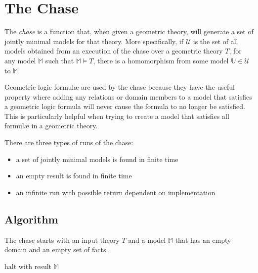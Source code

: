 \section{The Chase}

	The \emph{chase} is a function that, when given a geometric theory, will
	generate a set of jointly minimal models for that theory. More
	specifically, if $\mathcal{U}$ is the set of all models obtained from an
	execution of the chase over a geometric theory $T$, for any model
	$\mathbb{M}$ such that $\mathbb{M} \models T$, there is a homomorphism from
	some model $\mathbb{U} \in \mathcal{U}$ to $\mathbb{M}$.

	Geometric logic formul{\ae} are used by the chase because they have the
	useful property where adding any relations or domain members to a model
	that satisfies a geometric logic formula will never cause the formula to no
	longer be satisfied. This is particularly helpful when trying to create a
	model that satisfies all formul{\ae} in a geometric theory.

	There are three types of runs of the chase:
	\begin{itemize}
	\item a set of jointly minimal models is found in finite time
	\item an empty result is found in finite time
	\item an infinite run with possible return dependent on implementation
	\end{itemize}

	\subsection{Algorithm}

		The chase starts with an input theory $T$ and a model $\mathbb{M}$ that
		has an empty domain and an empty set of facts.

		\begin{algorithm}[H]
		\DontPrintSemicolon
		halt with result $\mathbb{M}$ \;
		\end{algorithm}


